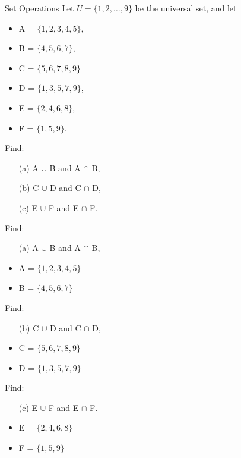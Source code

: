 \documentclass[11pt,a4paper,titlepage,oneside,openany]{article}
\numberwithin{equation}{section}
\numberwithin{algorithm}{section}
\numberwithin{figure}{section}
\numberwithin{table}{section}
\begin{document}
{%
\newpage



{Set Operations}
Let $U = \{1,2,\ldots, 9\}$ be the universal set, and let
\begin{itemize}
\item A = $\{1, 2, 3, 4, 5\}$,  
\item B = $\{4, 5, 6, 7\}$,  
\item C = $\{5, 6, 7, 8, 9\}$
\item D = $\{1, 3, 5, 7, 9\}$,
\item E = $\{2, 4, 6, 8\}$,
\item F = $\{1, 5, 9\}$.
\end{itemize}


Find: 
\begin{itemize}
\item[(a)] A $\cup$ B and A $\cap$ B, 
\item[(b)] C $\cup$ D and C $\cap$ D, 
\item[(c)] E $\cup$ F and E $\cap$ F.
\end{itemize}


Find: 
\begin{itemize}
\item[(a)] A $\cup$ B and A $\cap$ B, \bigskip
\item A = $\{1, 2, 3, 4, 5\}$  
\item B = $\{4, 5, 6, 7\}$  
\end{itemize}




Find: 
\begin{itemize}
\item[(b)] C $\cup$ D and C $\cap$ D,  \bigskip
\item C = $\{5, 6, 7, 8, 9\}$
\item D = $\{1, 3, 5, 7, 9\}$
\end{itemize}

Find: 
\begin{itemize}
\item[(c)] E $\cup$ F and E $\cap$ F. \bigskip
\item E = $\{2, 4, 6, 8\}$

\item F = $\{1, 5, 9\}$
\end{itemize}



}
\end{document}
